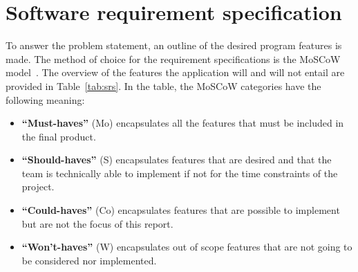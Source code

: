 \section{Software requirement specification}\label{sec:software-requirement-specification}

To answer the problem statement, an outline of the desired program features is made.
The method of choice for the requirement specifications is the MoSCoW model~\cite{hudaib2018}.
The overview of the features the application will and will not entail are provided in Table~\ref{tab:srs}.
In the table, the MoSCoW categories have the following meaning:

\begin{itemize}
    \item \textbf{``Must-haves''} (Mo) encapsulates all the features that must be
    included in the final product.
    \item \textbf{``Should-haves''} (S) encapsulates features that are desired and that the team is technically able to
    implement if not for the time constraints of the project.
    \item \textbf{``Could-haves''} (Co) encapsulates features that are possible
    to implement but are not the focus of this report.
    \item \textbf{``Won't-haves''} (W) encapsulates out of scope features that are not going to be considered nor
    implemented.
\end{itemize}

